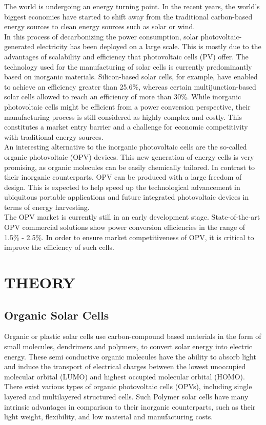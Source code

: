 \documentclass[letterpaper, 10 pt, conference]{ieeeconf}
\begin{document}
The world is undergoing an energy turning point. In the recent years, the world’s biggest economies have started to shift away from the traditional carbon-based energy sources to clean energy sources such as solar or wind. \\
 In this process of decarbonizing the power consumption, solar photovoltaic-generated electricity has been deployed on a large scale. This is mostly due to the advantages of scalability and efficiency that photovoltaic cells (PV) offer. The technology used for the manufacturing of solar cells is currently predominantly based on inorganic materials. Silicon-based solar cells, for example, have enabled to achieve an efficiency greater than 25.6\%, whereas certain multijunction-based solar cells allowed to reach an efficiency of more than 30\%. While inorganic photovoltaic cells might be efficient from a power conversion perspective, their manufacturing process is still considered as highly complex and costly. This constitutes a market entry barrier and a challenge for economic competitivity with traditional energy sources. \\
An interesting alternative to the inorganic photovoltaic cells are the so-called organic photovoltaic (OPV) devices. This new generation of energy cells is very promising, as organic molecules can be easily chemically tailored. In contrast to their inorganic counterparts, OPV can be produced with a large freedom of design. This is expected to help speed up the technological advancement in ubiquitous portable applications and future integrated photovoltaic devices in terms of energy harvesting.\\
The OPV market is currently still in an early development stage. State-of-the-art OPV commercial solutions show power conversion efficiencies in the range of 1.5\% - 2.5\%. In order to ensure market competitiveness of OPV, it is critical to improve the efficiency of such cells.


\section{THEORY}

\subsection{Organic Solar Cells}

Organic or plastic solar cells use carbon-compound based materials in the form of small molecules, dendrimers and polymers, to convert solar energy into electric energy. These semi conductive organic molecules have the ability to absorb light and induce the transport of electrical charges between the lowest unoccupied molecular orbital (LUMO) and highest occupied molecular orbital (HOMO). \\
There exist various types of organic photovoltaic cells (OPVs), including single layered and multilayered structured cells. Such Polymer solar cells have many intrinsic advantages in comparison to their inorganic counterparts, such as their light weight, flexibility, and low material and manufacturing costs.
\end{document}

